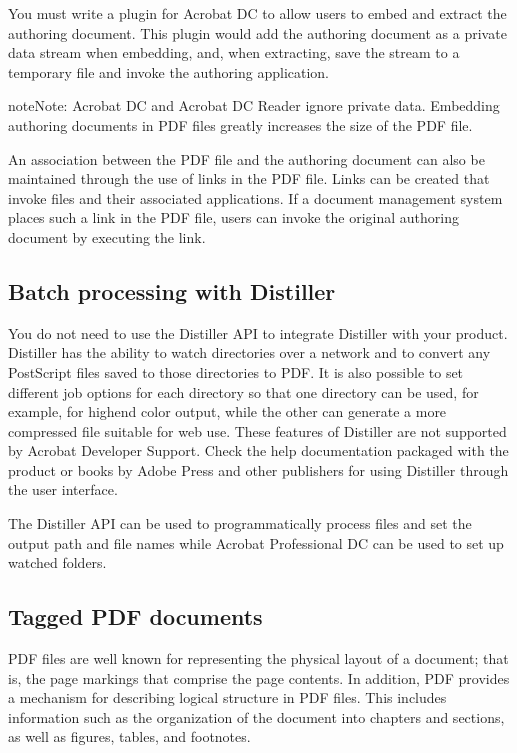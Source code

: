 \documentclass[letterpaper,12pt,english,openany,oneside]{sphinxmanual}
\begin{document}
You must write a plug\sphinxhyphen{}in for Acrobat DC to allow users to embed and extract the authoring document. This plug\sphinxhyphen{}in would add the authoring document as a private data stream when embedding, and, when extracting, save the stream to a temporary file and invoke the authoring application.

\begin{sphinxadmonition}{note}{Note:}
Acrobat DC and Acrobat DC Reader ignore private data. Embedding authoring documents in PDF files greatly increases the size of the PDF file.
\end{sphinxadmonition}

An association between the PDF file and the authoring document can also be maintained through the use of links in the PDF file. Links can be created that invoke files and their associated applications. If a document management system places such a link in the PDF file, users can invoke the original authoring document by executing the link.




\subsection{Batch processing with Distiller}
\label{\detokenize{Overview_PDFCreation:batch-processing-with-distiller}}
You do not need to use the Distiller API to integrate Distiller with your product. Distiller has the ability to watch directories over a network and to convert any PostScript files saved to those directories to PDF. It is also possible to set different job options for each directory so that one directory can be used, for example, for high\sphinxhyphen{}end color output, while the other can generate a more compressed file suitable for web use. These features of Distiller are not supported by Acrobat Developer Support. Check the help documentation packaged with the product or books by Adobe Press and other publishers for using Distiller through the user interface.

The Distiller API can be used to programmatically process files and set the output path and file names while Acrobat Professional DC can be used to set up watched folders.




\subsection{Tagged PDF documents}
\label{\detokenize{Overview_PDFCreation:tagged-pdf-documents}}
PDF files are well known for representing the physical layout of a document; that is, the page markings that comprise the page contents. In addition, PDF provides a mechanism for describing logical structure in PDF files. This includes information such as the organization of the document into chapters and sections, as well as figures, tables, and footnotes.
\end{document}
